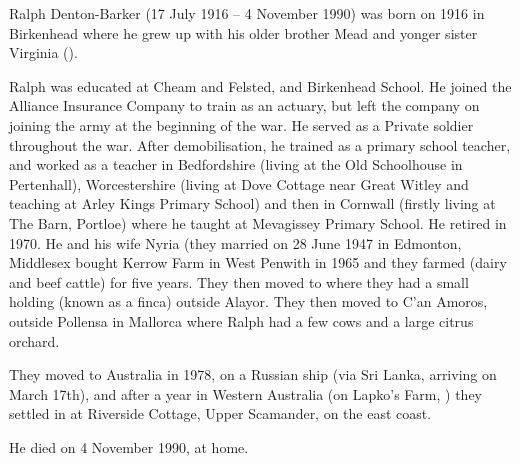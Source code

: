 
Ralph Denton-Barker (17 July 1916 -- 4 November 1990) was born on 1916 in Birkenhead \cite{BMDIndex_RalphMundayDentonBarker_birth} where he grew up with his older brother Mead and yonger sister Virginia ().

Ralph was educated at Cheam and Felsted, and Birkenhead School. He joined the Alliance Insurance Company to train as an actuary, but left the company on joining the army at the beginning of the war. He served as a Private soldier throughout the war. After demobilisation, he trained as a primary school teacher, and worked as a teacher in Bedfordshire (living at the Old Schoolhouse in Pertenhall), Worcestershire (living at Dove Cottage near Great Witley and teaching at Arley Kings Primary School) and then in Cornwall (firstly living at The Barn, Portloe) where he taught at Mevagissey Primary School.  He retired in 1970.  He and his wife Nyria (they married on 28 June 1947 in Edmonton, Middlesex \cite{MarriageCertRalphDentonBarkerJoanNyriaPowell} bought Kerrow Farm in West Penwith in 1965 and they farmed (dairy and beef cattle) for five years. They then moved to  where they had a small holding (known as a finca) outside Alayor. They then moved to C'an Amoros, outside Pollensa in Mallorca where Ralph had a few cows and a large citrus orchard.

They moved to Australia in 1978, on a Russian ship (via Sri Lanka, arriving on March 17th), and after a year in Western Australia (on Lapko's Farm, ) they settled in  at Riverside Cottage, Upper Scamander, on the east coast.

He died on 4 November 1990, at home.

